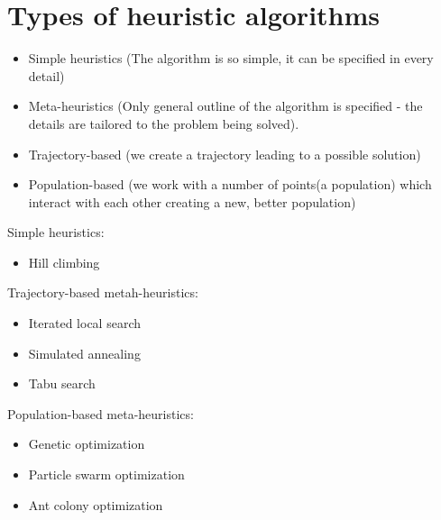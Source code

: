\section{Types of heuristic algorithms}
\begin{itemize}
        \item Simple heuristics (The algorithm is so simple, it can be specified in every detail)
        \item Meta-heuristics (Only general outline of the algorithm is specified - the details are tailored to the problem being solved).
        \item Trajectory-based (we create a trajectory leading to a possible solution)
        \item Population-based (we work with a number of points(a population) which interact with each other creating a new, better population)
        
\end{itemize}
Simple heuristics:
\begin{itemize}
        \item Hill climbing
        
\end{itemize}
Trajectory-based metah-heuristics:
\begin{itemize}
        \item Iterated local search
        \item Simulated annealing
        \item Tabu search
\end{itemize}
Population-based meta-heuristics:
\begin{itemize}
        \item Genetic optimization
        \item Particle swarm optimization
        \item Ant colony optimization
\end{itemize}



